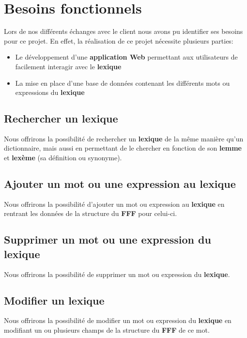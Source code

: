 \section{Besoins fonctionnels}
Lors de nos différents échanges avec le client nous avons pu identifier ses besoins pour ce projet. En effet, la réalisation de ce projet nécessite plusieurs parties:
\begin{itemize}
\item Le développement d'une \textbf{application Web} permettant aux utilisateurs de facilement interagir avec le \textbf{lexique}
\item La mise en place d'une base de données contenant les différents mots ou expressions du \textbf{lexique}
\end{itemize}


\subsection{Rechercher un lexique}

{Nous offrirons la possibilité de rechercher un \textbf{lexique} de la même manière qu'un dictionnaire, mais aussi en permettant de le chercher en fonction de son \textbf{lemme} et \textbf{lexème} (sa définition ou synonyme).\par}

\subsection{Ajouter un mot ou une expression au lexique}

{Nous offrirons la possibilité d'ajouter un mot ou expression au \textbf{lexique} en rentrant les données de la structure du \textbf{FFF} pour celui-ci.\par}

\subsection{Supprimer un mot ou une expression du lexique}
{Nous offrirons la possibilité de supprimer un mot ou expression du \textbf{lexique}.\par}

\subsection{Modifier un lexique}
 
{Nous offrirons la possibilité de modifier un mot ou expression du \textbf{lexique} en modifiant un ou plusieurs champs de la structure du \textbf{FFF} de ce mot.\par}
 

